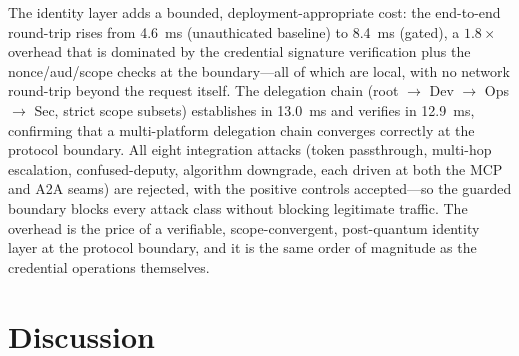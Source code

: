 \documentclass[10pt,twocolumn]{IEEEtran}
\begin{document}
The identity layer adds a bounded, deployment-appropriate cost: the
end-to-end round-trip rises from 4.6~ms (unauthicated baseline) to
8.4~ms (gated), a $1.8\times$ overhead that is dominated by the
credential signature verification plus the nonce/aud/scope checks at
the boundary---all of which are local, with no network round-trip
beyond the request itself. The delegation chain (root
$\to$ Dev $\to$ Ops $\to$ Sec, strict scope subsets) establishes in
13.0~ms and verifies in 12.9~ms, confirming that a multi-platform
delegation chain converges correctly at the protocol boundary. All
eight integration attacks (token passthrough, multi-hop escalation,
confused-deputy, algorithm downgrade, each driven at both the MCP and
A2A seams) are rejected, with the positive controls accepted---so the
guarded boundary blocks every attack class without blocking legitimate
traffic. The overhead is the price of a verifiable, scope-convergent,
post-quantum identity layer at the protocol boundary, and it is the
same order of magnitude as the credential operations themselves.

\section{Discussion}
\label{sec:discussion}
\end{document}
